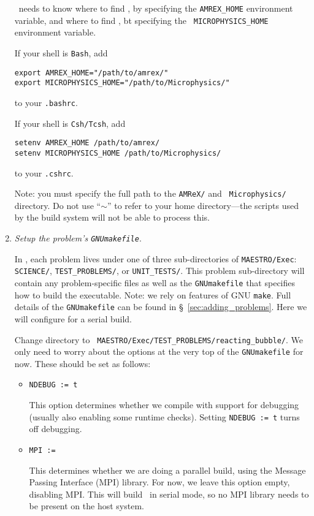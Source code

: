 \begin{enumerate}
  \maestro\ needs to know where to find \amrex, by specifying the
  {\tt AMREX\_HOME} environment variable, and where
  to find \microphysics, bt specifying the {\tt
  MICROPHYSICS\_HOME} environment variable.

  If your shell is {\tt Bash}, add
  \begin{verbatim}
export AMREX_HOME="/path/to/amrex/"
export MICROPHYSICS_HOME="/path/to/Microphysics/"
  \end{verbatim}
  to your {\tt .bashrc}. 

  If your shell is {\tt Csh/Tcsh}, add
  \begin{verbatim}
setenv AMREX_HOME /path/to/amrex/
setenv MICROPHYSICS_HOME /path/to/Microphysics/
  \end{verbatim}
  to your {\tt .cshrc}.  

  Note: you must specify the full path to the {\tt AMReX/} and {\tt
    Microphysics/} directory.  Do not use ``$\sim$'' to refer to your
  home directory---the scripts used by the build system will not be
  able to process this.

\item {\em Setup the problem's {\tt GNUmakefile}}.

  In \maestro, each problem lives under one of three sub-directories
  of {\tt MAESTRO/Exec}: {\tt SCIENCE/}, {\tt TEST\_PROBLEMS/}, or
  {\tt UNIT\_TESTS/}.  This problem sub-directory will contain any
  problem-specific files as well as the {\tt GNUmakefile} that
  specifies how to build the executable.  Note: we rely on features of
  GNU {\tt make}.  Full details of the {\tt GNUmakefile} can be found
  in \S~\ref{sec:adding_problems}.  Here we will configure for a
  serial build.

  Change directory to {\tt
    MAESTRO/Exec/TEST\_PROBLEMS/reacting\_bubble/}.  We only need to
  worry about the options at the very top of the {\tt GNUmakefile} for
  now.  These should be set as follows:
  \begin{itemize}
  \item {\tt NDEBUG := t}

    This option determines whether we compile with support for
    debugging (usually also enabling some runtime checks).  Setting
    {\tt NDEBUG := t} turns off debugging.

  \item {\tt MPI := }

    This determines whether we are doing a parallel build, using the
    Message Passing Interface (MPI) library.  For now, we leave this
    option empty, disabling MPI.  This will build \maestro\ in serial
    mode, so no MPI library needs to be present on the host system.


\end{itemize}
\end{enumerate}
